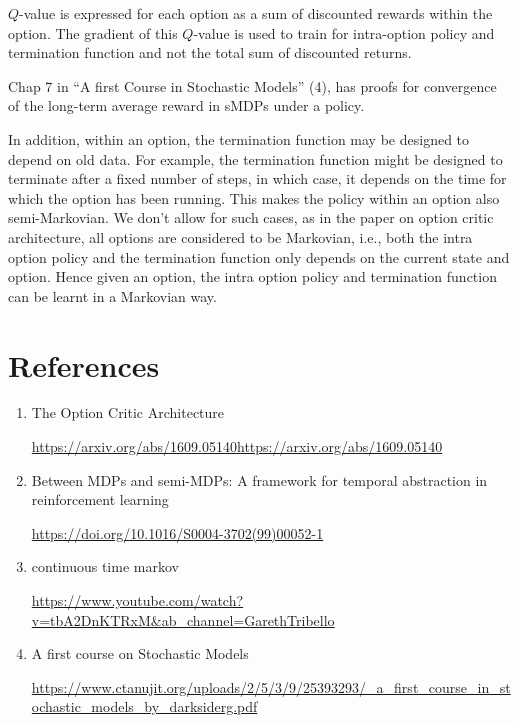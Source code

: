 \( Q \)-value is expressed for each option as a sum of discounted rewards within the option.
The gradient of this \( Q \)-value is used to train for intra-option policy and termination function and not the total sum of discounted returns.

Chap 7 in “A first Course in Stochastic Models” (4), has proofs for convergence of the long-term average reward in sMDPs under a policy.

In addition, within an option, the termination function may be designed to depend on old data.
For example, the termination function might be designed to terminate after a fixed number of steps, in which case, it depends on the time for which the option has been running.
This makes the policy within an option also semi-Markovian.
We don't allow for such cases, as in the paper on option critic architecture, all options are considered to be Markovian, i.e., both the intra option policy and the termination function only depends on the current state and option.
Hence given an option, the intra option policy and termination function can be learnt in a Markovian way.


\section{References}

\begin{enumerate}
    \item The Option Critic Architecture

          \url{https://arxiv.org/abs/1609.05140https://arxiv.org/abs/1609.05140}


    \item Between MDPs and semi-MDPs: A framework for temporal abstraction in reinforcement learning

          \url{https://doi.org/10.1016/S0004-3702(99)00052-1}


    \item continuous time markov

          \url{https://www.youtube.com/watch?v=tbA2DnKTRxM&ab_channel=GarethTribello}


    \item A first course on Stochastic Models

          \url{https://www.ctanujit.org/uploads/2/5/3/9/25393293/_a_first_course_in_stochastic_models_by_darksiderg.pdf}

\end{enumerate}

